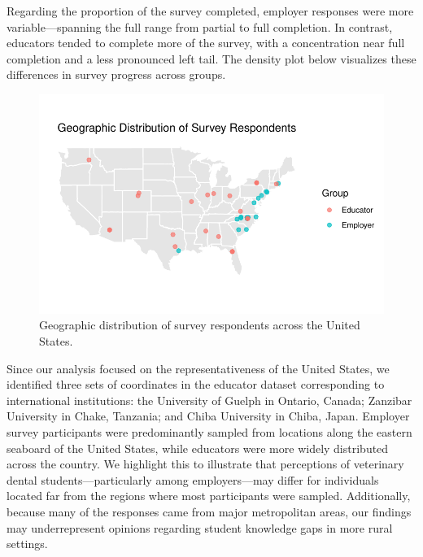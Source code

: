 \documentclass[
  11pt,
  letterpaper,
  DIV=11,
  numbers=noendperiod]{scrartcl}
\numberwithin{figure}{section}
\begin{document}
Regarding the proportion of the survey completed, employer responses
were more variable---spanning the full range from partial to full
completion. In contrast, educators tended to complete more of the
survey, with a concentration near full completion and a less pronounced
left tail. The density plot below visualizes these differences in survey
progress across groups.

\begin{figure}[H]

{\centering \includegraphics{Final-Project_files/figure-pdf/Data_Desc_06-1.pdf}

}

\caption{Geographic distribution of survey respondents across the United
States.}

\end{figure}

Since our analysis focused on the representativeness of the United
States, we identified three sets of coordinates in the educator dataset
corresponding to international institutions: the University of Guelph in
Ontario, Canada; Zanzibar University in Chake, Tanzania; and Chiba
University in Chiba, Japan. Employer survey participants were
predominantly sampled from locations along the eastern seaboard of the
United States, while educators were more widely distributed across the
country. We highlight this to illustrate that perceptions of veterinary
dental students---particularly among employers---may differ for
individuals located far from the regions where most participants were
sampled. Additionally, because many of the responses came from major
metropolitan areas, our findings may underrepresent opinions regarding
student knowledge gaps in more rural settings.
\end{document}
